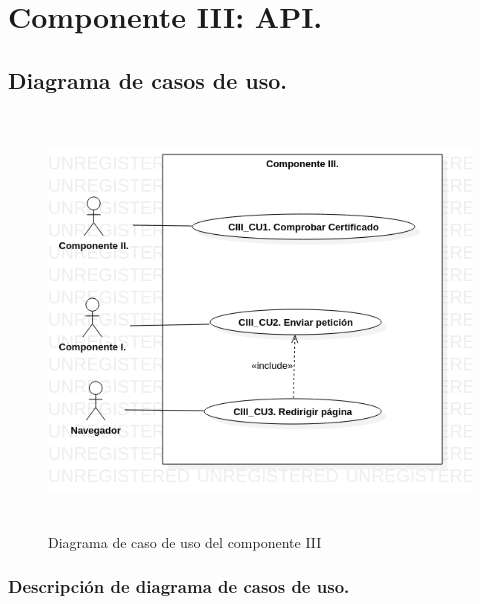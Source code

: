 \documentclass[12pt, a4paper, titlepage]{report}
\begin{document}
	    \section{Componente III: API.}
	
	        \subsection{Diagrama de casos de uso.}
	    
        	    \begin{figure}[H]
        	        \centering       	        \includegraphics[height=11cm]{imagenes/Disenio/Componente_3/CIII_UCD.png}
        	        \caption{Diagrama de caso de uso del componente III}
        	        \label{fig:CIII_UCD}
        	    \end{figure}
	    
	        \subsubsection{Descripción de diagrama de casos de uso.}
	        
\end{document}
